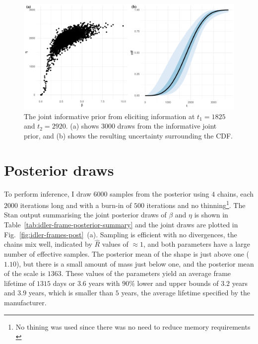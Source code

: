 \begin{figure}
  \centering
  \includegraphics[width=1\textwidth]{./figures/ch-3/idler-frame-prior.pdf}
  \caption{The joint informative prior from eliciting information at $t_1 = 1825$ and $t_2 = 2920$. (a) shows 3000 draws from the informative joint prior, and (b) shows the resulting uncertainty surrounding the CDF.}
  \label{fig:idler-frames-prior}
\end{figure}

\section{Posterior draws} \label{sec:idler-frame-posterior}

To perform inference, I draw $6000$ samples from the posterior using $4$ chains, each $2000$ iterations long and with a burn-in of $500$ iterations and no thinning\footnote{No thining was used since there was no need to reduce memory requirements \citep[Section 16.4.]{Stan2024}}. The Stan output summarising the joint posterior draws of $\beta$ and $\eta$ is shown in Table~\ref{tab:idler-frame-posterior-summary} and the joint draws are plotted in Fig.~\ref{fig:idler-frames-post}~(a). Sampling is efficient with no divergences, the chains mix well, indicated by $\hat{R}$ values of $\approx 1$, and both parameters have a large number of effective samples. The posterior mean of the shape is just above one ($1.10$), but there is a small amount of mass just below one, and the posterior mean of the scale is $1363$. These values of the parameters yield an average frame lifetime of $1315$ days or $3.6$ years with $90\%$ lower and upper bounds of $3.2$ years and $3.9$ years, which is smaller than $5$ years, the average lifetime  specified by the manufacturer.



